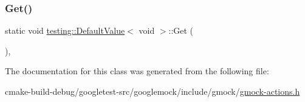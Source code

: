 \subsubsection{\texorpdfstring{Get()}{Get()}}
{\footnotesize\ttfamily static void \mbox{\hyperlink{classtesting_1_1DefaultValue}{testing\+::\+Default\+Value}}$<$ void $>$\+::Get (\begin{DoxyParamCaption}{ }\end{DoxyParamCaption})\hspace{0.3cm}{\ttfamily [inline]}, {\ttfamily [static]}}



The documentation for this class was generated from the following file\+:\begin{DoxyCompactItemize}
\item 
cmake-\/build-\/debug/googletest-\/src/googlemock/include/gmock/\mbox{\hyperlink{gmock-actions_8h}{gmock-\/actions.\+h}}\end{DoxyCompactItemize}
